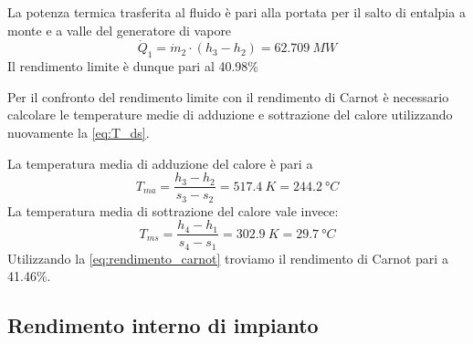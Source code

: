 La potenza termica trasferita al fluido è pari alla portata per il salto di entalpia a monte e a valle del generatore di vapore
\begin{equation*}
    \dot Q_1 = \dot m_2 \cdot (h_3-h_2) = 62.709\ MW
\end{equation*}
Il rendimento limite è dunque pari al 40.98\%

Per il confronto del rendimento limite con il rendimento di Carnot è necessario calcolare le temperature medie di adduzione e sottrazione del calore
utilizzando nuovamente la \eqref{eq:T_ds}.

La temperatura media di adduzione del calore è pari a
\begin{equation*}
    T_{ma} = \frac{h_3 - h_2}{s_3 - s_2} = 517.4\ K = 244.2\ \text{°}C
\end{equation*}
La temperatura media di sottrazione del calore vale invece:
\begin{equation*}
    T_{ms} = \frac{h_4-h_1}{s_4 - s_1} = 302.9\ K = 29.7\ \text{°}C
\end{equation*}
Utilizzando la \eqref{eq:rendimento_carnot} troviamo il rendimento di Carnot pari a 41.46\%.

\subsection{Rendimento interno di impianto}



